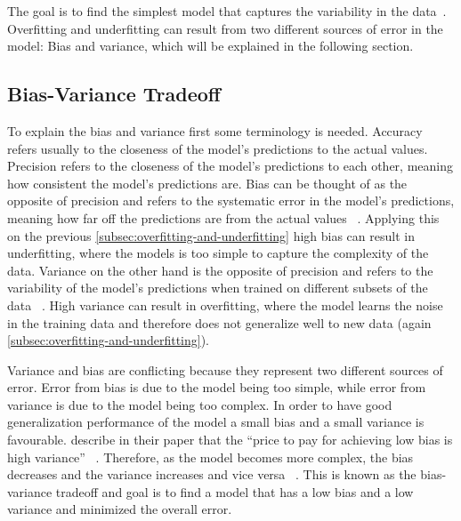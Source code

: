 The goal is to find the simplest model that captures the variability in the
data~\cite[p. 35]{muller2016introduction}.
Overfitting and underfitting can result from two different sources of error in the model: Bias and variance, which
will be explained in the following section.

\subsection{Bias-Variance Tradeoff}\label{subsec:bias-variance-tradeoff}
To explain the bias and variance first some terminology is needed.
Accuracy refers usually to the closeness of the model's predictions to the actual values.
Precision refers to the closeness of the model's predictions to each other, meaning how consistent the model's
predictions
are.
Bias can be thought of as the opposite of precision and refers to the systematic error in the model's predictions,
meaning how far off the predictions are from the actual values
~\cite[p. 2]{doroudi2020bias}.
Applying this on the previous \cref{subsec:overfitting-and-underfitting} high bias can result in underfitting, where
the models is too simple to capture the complexity of the data.
Variance on the other hand is the opposite of precision and refers to the variability of the model's predictions when
trained on different subsets of the data
~\cite[p. 2]{doroudi2020bias}.
High variance can result in overfitting, where the model learns the noise in the training data and therefore does not
generalize well to new data (again \cref{subsec:overfitting-and-underfitting}).

Variance and bias are conflicting because they represent two different sources of error.
Error from bias is due to the model being too simple, while error from variance is due to the model being too
complex.
In order to have good generalization performance of the model a small bias and a small variance is favourable.
\cite{geman1992neural} describe in their paper that the ``price to pay for achieving low bias is high variance''
~\cite[p. 14]{geman1992neural}.
Therefore, as the model becomes more complex, the bias decreases and the variance increases and vice versa
~\cite[p. 14]{geman1992neural}.
This is known as the bias-variance tradeoff and goal is to find a model that has a low bias and a low variance
and minimized the overall error.

